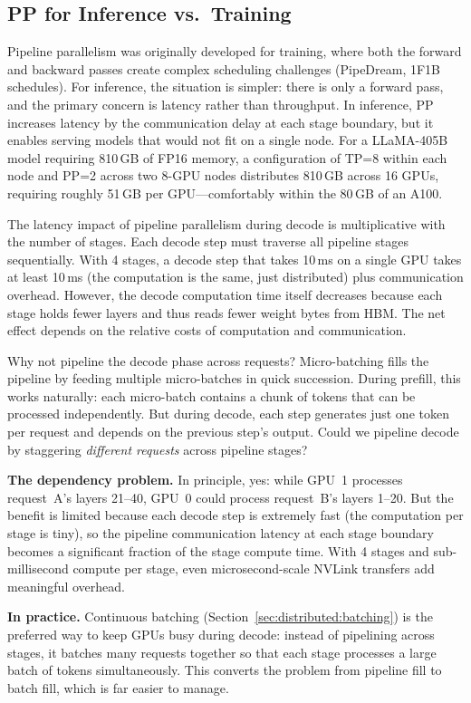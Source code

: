 \subsection{PP for Inference vs.\ Training}

Pipeline parallelism was originally developed for training, where both the forward and backward passes create complex scheduling challenges (PipeDream, 1F1B schedules). For inference, the situation is simpler: there is only a forward pass, and the primary concern is latency rather than throughput. In inference, PP increases latency by the communication delay at each stage boundary, but it enables serving models that would not fit on a single node. For a LLaMA-405B model requiring 810\,GB of FP16 memory, a configuration of TP=8 within each node and PP=2 across two 8-GPU nodes distributes 810\,GB across 16 GPUs, requiring roughly 51\,GB per GPU---comfortably within the 80\,GB of an A100.

\begin{notebox}
The latency impact of pipeline parallelism during decode is multiplicative with the number of stages. Each decode step must traverse all pipeline stages sequentially. With 4 stages, a decode step that takes 10\,ms on a single GPU takes at least 10\,ms (the computation is the same, just distributed) plus communication overhead. However, the decode computation time itself decreases because each stage holds fewer layers and thus reads fewer weight bytes from HBM. The net effect depends on the relative costs of computation and communication.
\end{notebox}

\begin{whynotbox}{Why not pipeline the decode phase across requests?}
Micro-batching fills the pipeline by feeding multiple micro-batches in quick succession. During prefill, this works naturally: each micro-batch contains a chunk of tokens that can be processed independently. But during decode, each step generates just one token per request and depends on the previous step's output. Could we pipeline decode by staggering \emph{different requests} across pipeline stages?

\textbf{The dependency problem.} In principle, yes: while GPU~1 processes request~A's layers 21--40, GPU~0 could process request~B's layers 1--20. But the benefit is limited because each decode step is extremely fast (the computation per stage is tiny), so the pipeline communication latency at each stage boundary becomes a significant fraction of the stage compute time. With 4 stages and sub-millisecond compute per stage, even microsecond-scale NVLink transfers add meaningful overhead.

\textbf{In practice.} Continuous batching (Section~\ref{sec:distributed:batching}) is the preferred way to keep GPUs busy during decode: instead of pipelining across stages, it batches many requests together so that each stage processes a large batch of tokens simultaneously. This converts the problem from pipeline fill to batch fill, which is far easier to manage.
\end{whynotbox}

